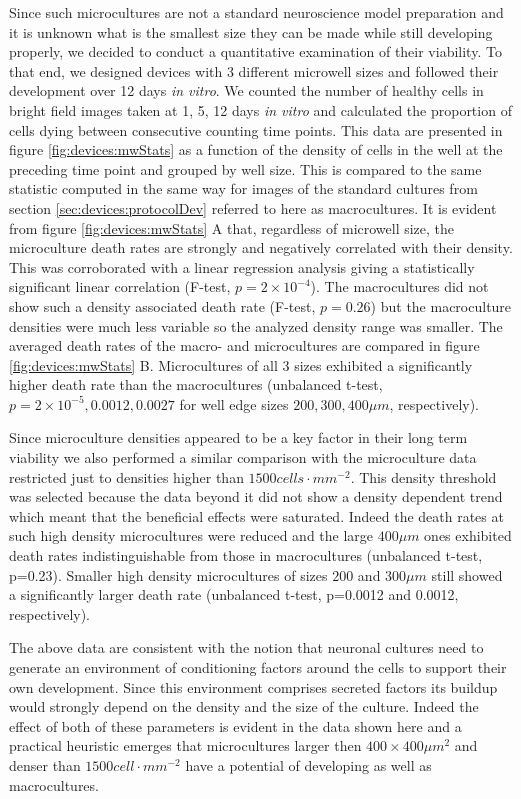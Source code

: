         Since such microcultures are not a standard neuroscience model preparation and it is unknown what is the smallest size they can be made while still developing properly, we decided to conduct a quantitative examination of their viability. To that end, we designed devices with 3 different microwell sizes and followed their development over 12 days \textit{in vitro}. We counted the number of healthy cells in bright field images taken at 1, 5, 12 days \textit{in vitro} and calculated the proportion of cells dying between consecutive counting time points. This data are presented in figure \ref{fig:devices:mwStats} as a function of the density of cells in the well at the preceding time point and grouped by well size. This is compared to the same statistic computed in the same way for images of the standard cultures from section \ref{sec:devices:protocolDev} referred to here as macrocultures. It is evident from figure \ref{fig:devices:mwStats} A that, regardless of microwell size, the microculture death rates are strongly and negatively correlated with their density. This was corroborated with a linear regression analysis giving a statistically significant linear correlation (F-test, \(p=2\times10^{-4}\)). The macrocultures did not show such a density associated death rate (F-test, \(p=0.26\)) but the macroculture densities were much less variable so the analyzed density range was smaller. The averaged death rates of the macro- and microcultures are compared in figure \ref{fig:devices:mwStats} B. Microcultures of all 3 sizes exhibited a significantly higher death rate than the macrocultures (unbalanced t-test, \(p=2\times10^{-5}, 0.0012, 0.0027\) for well edge sizes \(200,300,400 \mu m\), respectively).

        Since microculture densities appeared to be a key factor in their long term viability we also performed a similar comparison with the microculture data restricted just to densities higher than \(1500 cells\cdot mm^{-2}\). This density threshold was selected because the data beyond it did not show a density dependent trend which meant that the beneficial effects were saturated. Indeed the death rates at such high density microcultures were reduced and the large \(400 \mu m\) ones exhibited death rates indistinguishable from those in macrocultures (unbalanced t-test, p=0.23). Smaller high density microcultures of sizes \(200\) and \(300 \mu m\) still showed a significantly larger death rate (unbalanced t-test, p=0.0012 and 0.0012, respectively).

        The above data are consistent with the notion that neuronal cultures need to generate an environment of conditioning factors around the cells to support their own development. Since this environment comprises secreted factors its buildup would strongly depend on the density and the size of the culture. Indeed the effect of both of these parameters is evident in the data shown here and a practical heuristic emerges that microcultures larger then \(400\times400 \mu m^2\) and denser than \(1500 cell\cdot mm^{-2}\) have a potential of developing as well as macrocultures.

